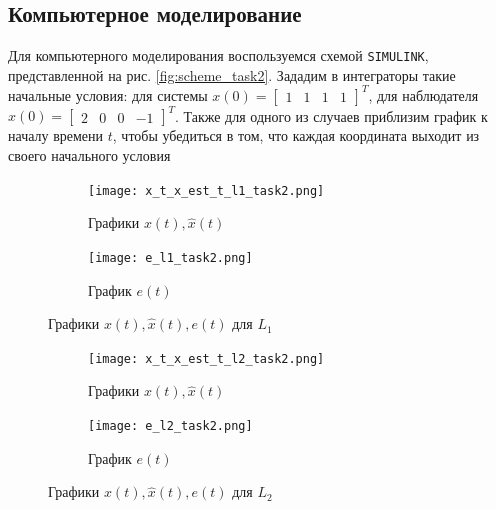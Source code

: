 \documentclass[a4paper, 12pt]{article}
\begin{document}
    \subsection{Компьютерное моделирование}
    Для компьютерного моделирования воспользуемся схемой \texttt{SIMULINK},
    представленной на рис. \ref{fig:scheme_task2}. Зададим в интеграторы
    такие начальные условия:
    для системы $x(0)=\begin{bmatrix}
        1 &1 &1 &1
    \end{bmatrix}^T$, для наблюдателя $\hat{x}(0)=\begin{bmatrix}
        2 &0 &0 &-1
    \end{bmatrix}^T$. Также для одного из случаев приблизим график к началу времени $t$,
    чтобы убедиться в том, что каждая координата выходит из своего начального условия
    \begin{figure}[H]
        \centering
        \begin{subfigure}{0.45\textwidth}
            \centering
            \texttt{[image: x\_t\_x\_est\_t\_l1\_task2.png]}
            \caption{Графики $x(t),\hat{x}(t)$}
            \label{fig:task_2_x_t_l1}
        \end{subfigure}
        \hfill
        \begin{subfigure}{0.45\textwidth}
            \centering
            \texttt{[image: e\_l1\_task2.png]}
            \caption{График $e(t)$}
            \label{fig:task_2_e_l1}
        \end{subfigure}
        \caption{Графики $x(t),\hat{x}(t),e(t)$ для $L_1$}
        \label{fig:task_2_modeling_1}
    \end{figure}
    \begin{figure}[H]
        \centering
        \begin{subfigure}{0.45\textwidth}
            \centering
            \texttt{[image: x\_t\_x\_est\_t\_l2\_task2.png]}
            \caption{Графики $x(t),\hat{x}(t)$}
            \label{fig:task_2_x_t_l2}
        \end{subfigure}
        \hfill
        \begin{subfigure}{0.45\textwidth}
            \centering
            \texttt{[image: e\_l2\_task2.png]}
            \caption{График $e(t)$}
            \label{fig:task_2_e_l2}
        \end{subfigure}
        \caption{Графики $x(t),\hat{x}(t),e(t)$ для $L_2$}
        \label{fig:task_2_modeling_2}
    \end{figure}
\end{document}
